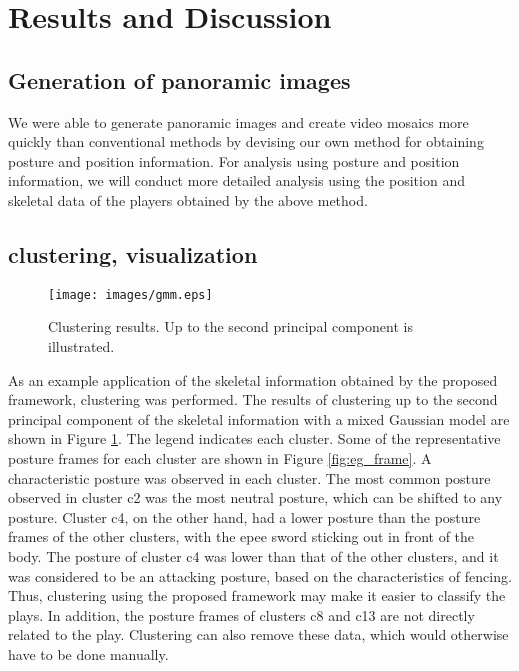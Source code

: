 \section{Results and Discussion}
\subsection{Generation of panoramic images}
We were able to generate panoramic images and create video mosaics more quickly than conventional methods by devising our own method for obtaining posture and position information. For analysis using posture and position information, we will conduct more detailed analysis using the position and skeletal data of the players obtained by the above method.

\subsection{clustering, visualization}

\begin{figure}
    \centering
    \texttt{[image: images/gmm.eps]}
    \caption{Clustering results. Up to the second principal component is illustrated.}
    \label{fig:gmm_result}
\end{figure}

As an example application of the skeletal information obtained by the proposed framework, clustering was performed.
The results of clustering up to the second principal component of the skeletal information with a mixed Gaussian model are shown in Figure \ref{fig:gmm_result}.
The legend indicates each cluster.
Some of the representative posture frames for each cluster are shown in Figure \ref{fig:eg_frame}.
A characteristic posture was observed in each cluster.
The most common posture observed in cluster c2 was the most neutral posture, which can be shifted to any posture.
Cluster c4, on the other hand, had a lower posture than the posture frames of the other clusters, with the epee sword sticking out in front of the body.
The posture of cluster c4 was lower than that of the other clusters, and it was considered to be an attacking posture, based on the characteristics of fencing.
Thus, clustering using the proposed framework may make it easier to classify the plays.
In addition, the posture frames of clusters c8 and c13 are not directly related to the play.
Clustering can also remove these data, which would otherwise have to be done manually.


